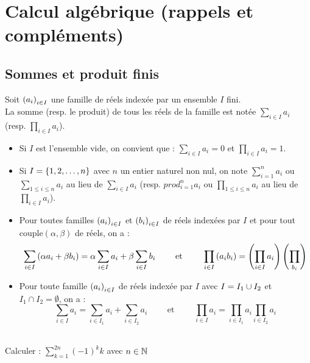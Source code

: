 \chapter{Calcul algébrique (rappels et compléments)}

\minitoc
\section{Sommes et produit finis}
\begin{nota}
	Soit \(\left(a_i\right)_{i\in I}\) une famille de réels indexée par un ensemble \(I\) fini. \\
	La somme (resp. le produit) de tous les réels de la famille est notée \(\sum_{i\in I} a_i\) (resp. \(\prod_{i\in I} a_i\)). \\
	\begin{itemize}
		\item Si \(I\) est l'ensemble vide, on convient que : \(\sum_{i\in I} a_i = 0\) et \(\prod_{i\in I} a_i = 1\).
		\item Si \(I = \left\lbrace1,2,\ldots,n\right\rbrace\) avec \(n\) un entier naturel non nul, on note \(\sum_{i=1}^n a_i\)  ou \(\sum_{1\leq i \leq n} a_i\) au lieu de \(\sum_{i\in I} a_i\) (resp. \(prod_{i=1}^n a_i\) ou \(\prod_{1\leq i \leq n} a_i\) au lieu de \(\prod_{i\in I} a_i\)).
	\end{itemize}
\end{nota}
\begin{prop}
	\begin{itemize}
		\item Pour toutes familles \(\left(a_i\right)_{i\in I}\) et \(\left(b_i\right)_{i\in I}\) de réels indexées par \(I\) et pour tout couple\((\alpha,\beta)\) de réels, on a :
		      \[ \sum_{i\in I} \left(\alpha a_i + \beta b_i\right) = \alpha \sum_{i\in I} a_i + \beta \sum_{i\in I} b_i \qquad \text{ et } \qquad \prod_{i\in I} \left(a_i b_i\right) = \left(\prod_{i\in I} a_i\right)\left(\prod_{b_i}\right)\]
		\item Pour toute famille \(\left(a_i\right)_{i\in I}\) de réels indexée par \(I\) avec \(I=I_1 \cup I_2\) et \(I_1\cap I_2 = \emptyset\), on a :
		      \[ \sum_{i\in I} a_i = \sum_{i\in I_1} a_i + \sum_{i\in I_2} a_i \qquad \text{ et } \qquad  \prod_{i\in I} a_i = \prod_{i\in I_1} a_i \prod_{i\in I_2} a_i \]
	\end{itemize}
\end{prop}

\begin{exoex}
	~\\
	Calculer : \(\sum_{k=1}^{2n} (-1)^k k \) avec \(n \in \mathbb{N}\)
\end{exoex}

